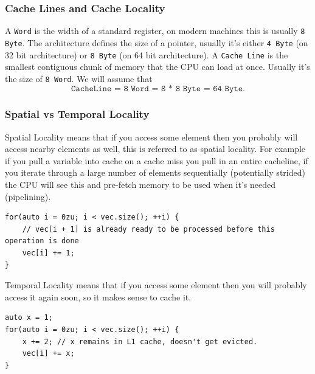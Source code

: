 \documentclass{article}
\begin{document}
\subsubsection{Cache Lines and Cache Locality}
A \texttt{Word} is the width of a standard register, on modern machines this is usually \texttt{8 Byte}. The architecture defines the size of a pointer, usually it's either \texttt{4 Byte} (on 32 bit architecture) or \texttt{8 Byte} (on 64 bit architecture). A \texttt{Cache Line} is the smallest contiguous chunk of memory that the CPU can load at once. Usually it's the size of \texttt{8 Word}. We will assume that 
\[
\texttt{CacheLine = 8 Word = 8 * 8 Byte = 64 Byte}.
\]

\subsubsection{Spatial vs Temporal Locality}
Spatial Locality means that if you access some element then you probably will access nearby elements as well, this is referred to as spatial locality. For example if you pull a variable into cache on a cache miss you pull in an entire cacheline, if you iterate through a large number of elements sequentially (potentially strided) the CPU will see this and pre-fetch memory to be used when it's needed (pipelining).
\begin{lstlisting}
for(auto i = 0zu; i < vec.size(); ++i) {
    // vec[i + 1] is already ready to be processed before this operation is done
    vec[i] += 1;
}
\end{lstlisting}

Temporal Locality means that if you access some element then you will probably access it again soon, so it makes sense to cache it.
\begin{lstlisting}
auto x = 1;
for(auto i = 0zu; i < vec.size(); ++i) {
    x += 2; // x remains in L1 cache, doesn't get evicted.
    vec[i] += x;
}
\end{lstlisting}
\end{document}
